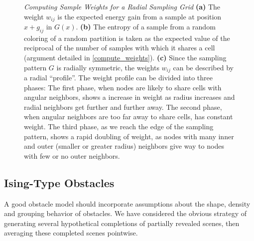 \begin{figure}[ht]
 \centering
{}\qquad
{}\qquad
{}
\caption{\emph{Computing Sample Weights for a Radial Sampling Grid}\label{fig:weights}
\textbf{(a)} The weight $w_{ij}$ is the expected energy gain from a sample at position $x+g_{ij}$ in $G(x)$.
\textbf{(b)} The entropy of a sample from 
a random coloring of a random partition is taken as the expected value of the reciprocal of the number of samples with which it shares a cell
(argument detailed in \ref{compute_weights}).
\textbf{(c)}  Since the sampling pattern $G$ is radially symmetric, the weights $w_{ij}$ can be described by a radial ``profile''.
The weight profile can be divided into three phases: The first phase, when nodes are likely to share cells with 
angular neighbors, shows a increase in weight as radius increases and radial neighbors get further and further away.
The second phase, when angular neighbors are too far away to share cells, has constant weight.  The third phase, as
we reach the edge of the sampling pattern, shows a rapid doubling of weight, as nodes with many inner and outer 
(smaller or greater radius) neighbors give way 
to nodes with few or no outer neighbors.
}
\end{figure}


\subsection{Ising-Type Obstacles}
A good obstacle model should incorporate assumptions about the shape, density and grouping behavior of obstacles.  We have considered the obvious strategy of generating several hypothetical completions of partially revealed scenes, then averaging these completed scenes pointwise.
